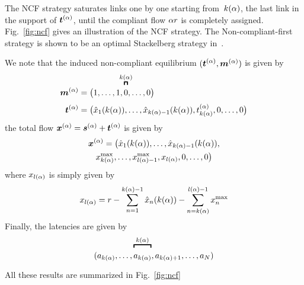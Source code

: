 The NCF strategy saturates links one by one starting from~$k(\alpha)$, the last link in the support of $\boldsymbol {t}^{(\alpha)}$, until the compliant flow $\alpha r$ is completely assigned. Fig.~\ref{fig:ncf} gives an illustration of the NCF strategy. The Non-compliant-first strategy is shown to be an optimal Stackelberg strategy in~\cite{krichene12}.

We note that the induced non-compliant equilibrium $( \boldsymbol {t}^{(\alpha)}, \boldsymbol {m}^{(\alpha)} )$ is given by
\begin{align}
\modeV^{(\cR)} &= \big( 1, \dots, 1, \overbracBig{0}{\lastNC{\cR}}, \dots, 0 \big) \label{eq:NCF-ncMode}\\
\tV^{(\cR)} &= \big( \cFlow{1}{\lastNC{\cR}}, \dots, \cFlow{\lastNC{\cR} - 1}{\lastNC{\cR}}, t^{(\cR)}_{\lastNC{\cR}}, 0, \dots, 0 \big) \label{eq:NCF-ncFlow}
\end{align}
the total flow $\boldsymbol {x}^{(\alpha)} = \boldsymbol {s}^{(\alpha)} + \boldsymbol {t}^{(\alpha)}$ is given by
\begin{multline}
\boldsymbol {x}^{(\alpha)} = \big( \hat{x}_{1} ( k(\alpha) ), \dots, \hat{x}_{k(\alpha) - 1} ( k(\alpha) ), \\
x^{\max}_{k(\alpha)}, \dots, x^{\max}_{l(\alpha) - 1}, 
x_{l(\alpha)}, 0, \dots, 0 \big)
\label{eq:NCF-totalFlow}
\end{multline}
where $x_{l(\alpha)}$ is simply given by
\[
x_{l(\alpha)} = r - \sum_{n = 1}^{k(\alpha) - 1} \hat{x}_{n} ( k(\alpha) ) - \sum_{n = k(\alpha)}^{l(\alpha) - 1} x^{\max}_n
\]
Finally, the latencies are given by
\[
(a_{\lastNC{\cR}}, \dots, \overbracBig{a_{\lastNC{\cR}}}{\lastNC{\cR}}, a_{\lastNC{\cR}+1}, \dots, a_{\NLinks} )
\]
All these results are summarized in Fig.~\ref{fig:ncf}